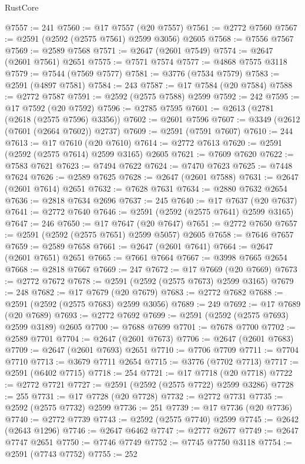 \begin{lexlean}{RustCore}
\begin{coremodule}
@7557 := 241
@7560 := @17 @7557 (@20 @7557)
@7561 := @2772 @7560
@7567 := @2591 (@2592 (@2575 @7561) @2599 @3056) @2605
@7568 := @7556 @7567
@7569 := @2589 @7568
@7571 := @2647 (@2601 @7549)
@7574 := @2647 (@2601 @7561) @2651
@7575 := @7571 @7574
@7577 := @4868 @7575 @3118
@7579 := @7544 (@7569 @7577)
@7581 := @3776 (@7534 @7579)
@7583 := @2591 (@4897 @7581)
@7584 := 243
@7587 := @17 @7584 (@20 @7584)
@7588 := @2772 @7587
@7591 := @2592 (@2575 @7588) @2599
@7592 := 242
@7595 := @17 @7592 (@20 @7592)
@7596 := @2785 @7595
@7601 := @2613 (@2781 (@2618 (@2575 @7596) @3356))
@7602 := @2601 @7596
@7607 := @3349 (@2612 (@7601 (@2664 @7602)) @2737)
@7609 := @2591 (@7591 @7607)
@7610 := 244
@7613 := @17 @7610 (@20 @7610)
@7614 := @2772 @7613
@7620 := @2591 (@2592 (@2575 @7614) @2599 @3165) @2605
@7621 := @7609 @7620
@7622 := @7583 @7621
@7623 := @7494 @7622
@7624 := @7470 @7623
@7625 := @7448 @7624
@7626 := @2589 @7625
@7628 := @2647 (@2601 @7588)
@7631 := @2647 (@2601 @7614) @2651
@7632 := @7628 @7631
@7634 := @2880 @7632 @2654
@7636 := @2818 @7634 @2696
@7637 := 245
@7640 := @17 @7637 (@20 @7637)
@7641 := @2772 @7640
@7646 := @2591 (@2592 (@2575 @7641) @2599 @3165)
@7647 := 246
@7650 := @17 @7647 (@20 @7647)
@7651 := @2772 @7650
@7657 := @2591 (@2592 (@2575 @7651) @2599 @5057) @2605
@7658 := @7646 @7657
@7659 := @2589 @7658
@7661 := @2647 (@2601 @7641)
@7664 := @2647 (@2601 @7651) @2651
@7665 := @7661 @7664
@7667 := @3998 @7665 @2654
@7668 := @2818 @7667
@7669 := 247
@7672 := @17 @7669 (@20 @7669)
@7673 := @2772 @7672
@7678 := @2591 (@2592 (@2575 @7673) @2599 @3165)
@7679 := 248
@7682 := @17 @7679 (@20 @7679)
@7683 := @2772 @7682
@7688 := @2591 (@2592 (@2575 @7683) @2599 @3056)
@7689 := 249
@7692 := @17 @7689 (@20 @7689)
@7693 := @2772 @7692
@7699 := @2591 (@2592 (@2575 @7693) @2599 @3189) @2605
@7700 := @7688 @7699
@7701 := @7678 @7700
@7702 := @2589 @7701
@7704 := @2647 (@2601 @7673)
@7706 := @2647 (@2601 @7683)
@7709 := @2647 (@2601 @7693) @2651
@7710 := @7706 @7709
@7711 := @7704 @7710
@7713 := @3679 @7711 @2654
@7715 := @3776 (@7702 @7713)
@7717 := @2591 (@6402 @7715)
@7718 := 254
@7721 := @17 @7718 (@20 @7718)
@7722 := @2772 @7721
@7727 := @2591 (@2592 (@2575 @7722) @2599 @3286)
@7728 := 255
@7731 := @17 @7728 (@20 @7728)
@7732 := @2772 @7731
@7735 := @2592 (@2575 @7732) @2599
@7736 := 251
@7739 := @17 @7736 (@20 @7736)
@7740 := @2772 @7739
@7743 := @2592 (@2575 @7740) @2599
@7745 := @2642 (@2643 @1296)
@7746 := @2647 @6462
@7747 := @2777 @2677
@7749 := @2647 @7747 @2651
@7750 := @7746 @7749
@7752 := @7745 @7750 @3118
@7754 := @2591 (@7743 @7752)
@7755 := 252

\end{coremodule}
\end{lexlean}
